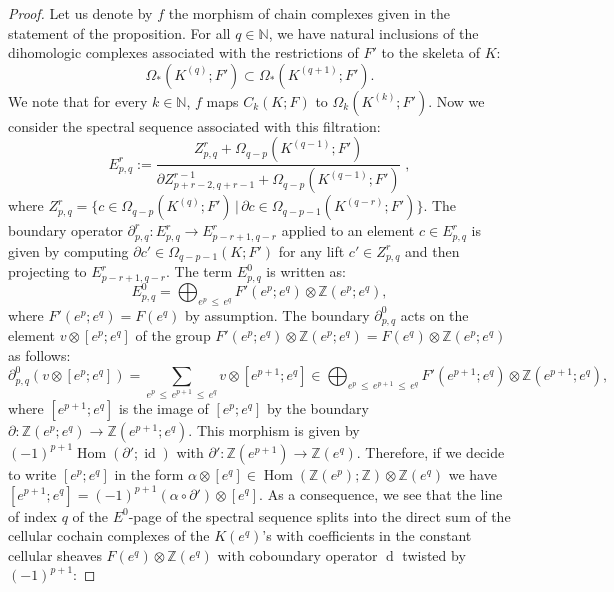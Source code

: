 \documentclass[AHL,Unicode,longabstracts,published]{cedram}
\newcommand{\Z}{\mathbb{Z}}
\newcommand{\N}{\mathbb{N}}
\DeclareMathOperator{\Hom}{Hom}
\DeclareMathOperator{\id}{id}
\DeclareMathOperator{\df}{d}
\begin{document}
\begin{proof}
Let us denote by $f$ the morphism of chain complexes given in the statement of the proposition. For all $q\in\N$, we have natural inclusions of the dihomologic complexes associated with the restrictions of $F'$ to the skeleta of $K$:
\begin{equation*}
\Omega_*\left(K^{(q)};F'\right)\subset \Omega_*\left(K^{(q+1)};F'\right).
\end{equation*}
We note that for every $k\in\N$, $f$ maps $C_k(K;F)$ to $\Omega_k(K^{(k)};F')$. Now we consider the spectral sequence associated with this filtration:
\begin{equation*}
E^r_{p,q}:=\frac{Z^r_{p,q} + \Omega_{q-p}\left(K^{(q-1)};F'\right)}{\partial Z^{r-1}_{p+r-2,q+r-1}+\Omega_{q-p}\left(K^{(q-1)};F'\right)}\;,
\end{equation*}
where $Z^r_{p,q}=\{c\in \Omega_{q-p}(K^{(q)};F') \,|\, \partial c \in \Omega_{q-p-1}(K^{(q-r)};F') \}$. The boundary operator $\partial^r_{p,q}:E^r_{p,q}\rightarrow E^r_{p-r+1,q-r}$ applied to an element $c\in E^r_{p,q}$ is given by computing $\partial c'\in \Omega_{q-p-1}(K;F')$ for any lift $c'\in Z^r_{p,q}$ and then projecting to $E^r_{p-r+1,q-r}$. The term $E^0_{p,q}$ is written as:
\begin{equation*}
E^0_{p,q}=\bigoplus_{e^p\,\leq\,e^q} F'(e^p;e^q)\otimes\Z(e^p;e^q),
\end{equation*}
where $F'(e^p;e^q)=F(e^q)$ by assumption. The boundary $\partial^0_{p,q}$ acts on the element $v\otimes[e^p;e^q]$ of the group $F'(e^p;e^q)\otimes\Z(e^p;e^q)=F(e^q)\otimes\Z(e^p;e^q)$ as follows:
\begin{equation*}
\partial^0_{p,q} \left(v\otimes[e^p;e^q]\right) =\sum_{e^p\,\leq\,e^{p+1}\,\leq \,e^q}v\otimes \left[e^{p+1};e^q\right] \in \bigoplus_{e^p\,\leq\,e^{p+1}\,\leq \,e^q}F'\left(e^{p+1};e^q\right)\otimes\Z\left(e^{p+1};e^q\right),
\end{equation*}
where $[e^{p+1};e^q]$ is the image of $[e^p;e^q]$ by the boundary $\partial:\Z(e^{p};e^q)\rightarrow \Z(e^{p+1};e^q)$. This morphism is given by $(-1)^{p+1}\Hom(\partial';\id)$ with $\partial':\Z(e^{p+1})\rightarrow\Z(e^q)$. Therefore, if we decide to write $[e^p;e^q]$ in the form $\alpha\otimes[e^q]\in \Hom(\Z(e^p);\Z)\otimes \Z(e^q)$ we have $[e^{p+1};e^q]=(-1)^{p+1}(\alpha\circ\partial')\otimes[e^q]$. As a consequence, we see that the line of index $q$ of the $E^0$-page of the spectral sequence splits into the direct sum of the cellular cochain complexes of the $K(e^q)$'s with coefficients in the constant cellular sheaves $F(e^q)\otimes\Z(e^q)$ with coboundary operator $\df$ twisted by $(-1)^{p+1}$:

\end{proof}
\end{document}
